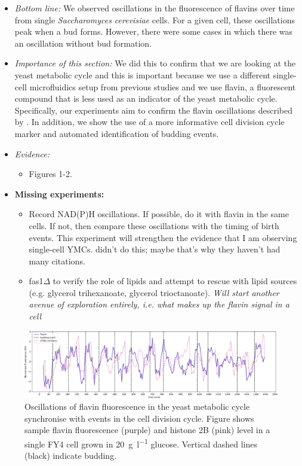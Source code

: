 \begin{itemize}
\item \emph{Bottom line:} We observed oscillations in the fluorescence of flavins over time from single \textit{Saccharomyces cerevisiae} cells.  For a given cell, these oscillations peak when a bud forms.  However, there were some cases in which there was an oscillation without bud formation.
\item \emph{Importance of this section:} We did this to confirm that we are looking at the yeast metabolic cycle and this is important because we use a different single-cell microfluidics setup from previous studies and we use flavin, a fluorescent compound that is less used as an indicator of the yeast metabolic cycle.  Specifically, our experiments aim to confirm the flavin oscillations described by \textcite{baumgartnerFlavinbasedMetabolicCycles2018}.  In addition, we show the use of a more informative cell division cycle marker and automated identification of budding events.
\item \emph{Evidence:}
\begin{itemize}
\item Figures 1-2.
\end{itemize}

\item \textbf{Missing experiments:}
\begin{itemize}
\item Record NAD(P)H oscillations.  If possible, do it with flavin in the same cells.  If not, then compare these oscillations with the timing of birth events.  This experiment will strengthen the evidence that I am observing single-cell YMCs.  \textcite{baumgartnerFlavinbasedMetabolicCycles2018} didn't do this; maybe that's why they haven't had many citations.
\item fas1$\Delta$ to verify the role of lipids and attempt to rescue with lipid sources (e.g. glycerol trihexanoate, glycerol trioctanoate). \emph{Will start another avenue of exploration entirely, i.e. what makes up the flavin signal in a cell}
\end{itemize}
\end{itemize}

\begin{figure}
  \centering
    \includegraphics[width=.9\linewidth]{single_birth_plot_edit.pdf}
    \caption{
      Oscillations of flavin fluorescence in the yeast metabolic cycle synchronise with events in the cell division cycle.
      Figure shows sample flavin fluorescence (purple) and histone 2B (pink) level in a single FY4 cell grown in \SI{20}{\gram~\litre^{-1}} glucose.
      Vertical dashed lines (black) indicate budding.
    }
  \label{fig:biology-highglc-single}
\end{figure}


